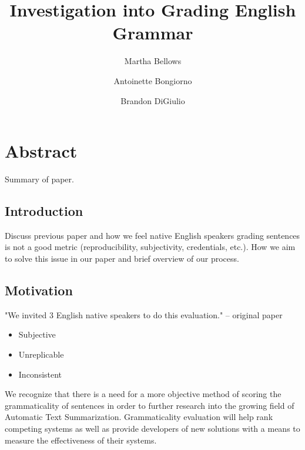 \documentclass[11pt,a4paper]{article}
\title{Investigation into Grading English Grammar}
\author{
        Martha Bellows 
\and
        Antoinette Bongiorno
\and 
	Brandon DiGiulio
}
\begin{document}
\maketitle

\section{Abstract}
Summary of paper. 

\pagebreak

\begin{multicols}{2}

\section{Introduction}
Discuss previous paper and how we feel native English speakers grading sentences is not a good metric (reproducibility, subjectivity, credentials, etc.). How we aim to solve this issue in our paper and brief overview of our process.


\subsection{Motivation}
"We invited 3 English native speakers to do this evaluation." -- original paper 
\begin{itemize}
  \item Subjective
  \item Unreplicable
  \item Inconsistent
\end{itemize}

We recognize that there is a need for a more objective method of scoring the grammaticality of sentences in order to further research into the growing field of Automatic Text Summarization.
Grammaticality evaluation will help rank competing systems as well as provide developers of new solutions with a means to measure the effectiveness of their systems.\\


\end{multicols}
\end{document}
